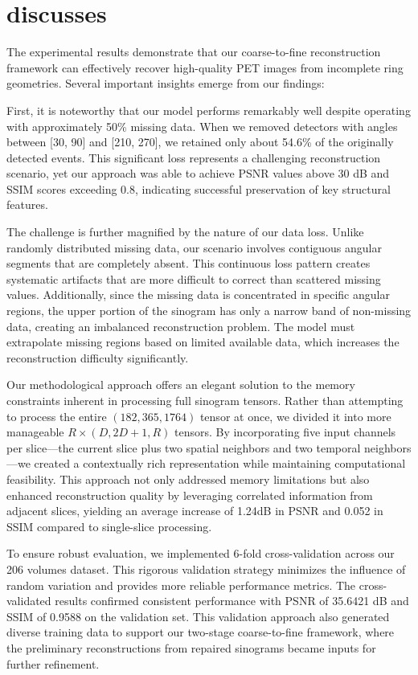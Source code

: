 \documentclass[
reprint,
superscriptaddress,
nofootinbib,
amsmath,amssymb,
aps,
prd,
]{revtex4-2}
\begin{document}
\section{discusses}

The experimental results demonstrate that our coarse-to-fine reconstruction framework can effectively recover high-quality PET images from incomplete ring geometries. Several important insights emerge from our findings:

First, it is noteworthy that our model performs remarkably well despite operating with approximately 50\% missing data. When we removed detectors with angles between [30, 90] and [210, 270], we retained only about 54.6\% of the originally detected events. This significant loss represents a challenging reconstruction scenario, yet our approach was able to achieve PSNR values above 30 dB and SSIM scores exceeding 0.8, indicating successful preservation of key structural features.

The challenge is further magnified by the nature of our data loss. Unlike randomly distributed missing data, our scenario involves contiguous angular segments that are completely absent. This continuous loss pattern creates systematic artifacts that are more difficult to correct than scattered missing values. Additionally, since the missing data is concentrated in specific angular regions, the upper portion of the sinogram has only a narrow band of non-missing data, creating an imbalanced reconstruction problem. The model must extrapolate missing regions based on limited available data, which increases the reconstruction difficulty significantly.

Our methodological approach offers an elegant solution to the memory constraints inherent in processing full sinogram tensors. Rather than attempting to process the entire $(182, 365, 1764)$ tensor at once, we divided it into more manageable $R\times(D, 2D+1, R)$ tensors. By incorporating five input channels per slice—the current slice plus two spatial neighbors and two temporal neighbors—we created a contextually rich representation while maintaining computational feasibility. This approach not only addressed memory limitations but also enhanced reconstruction quality by leveraging correlated information from adjacent slices, yielding an average increase of 1.24dB in PSNR and 0.052 in SSIM compared to single-slice processing.

To ensure robust evaluation, we implemented 6-fold cross-validation across our 206 volumes dataset. This rigorous validation strategy minimizes the influence of random variation and provides more reliable performance metrics. The cross-validated results confirmed consistent performance with PSNR of 35.6421 dB and SSIM of 0.9588 on the validation set. This validation approach also generated diverse training data to support our two-stage coarse-to-fine framework, where the preliminary reconstructions from repaired sinograms became inputs for further refinement.
\end{document}
